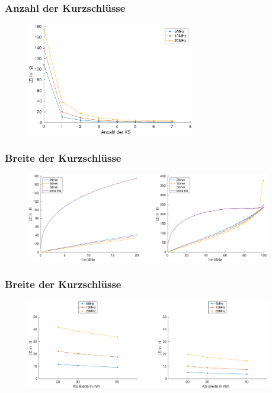 \documentclass[accentcolor=tud9b, colorbacktitle, inverttitle]{tudbeamer}
\begin{document}
\begin{frame}\frametitle{Anzahl der Kurzschl\"usse}
 \vspace{-1em}
\begin{figure}[h]
	\centering
	\includegraphics[width=0.65\textwidth]{RK_Impedanz_numberKS_frequenz}
\end{figure}
\end{frame}



\begin{frame}\frametitle{Breite der Kurzschlüsse}
\vspace{-1em}
\begin{figure}[h]
	\centering
	\includegraphics[width=0.95\textwidth]{Z_RK_width_1KS}
\end{figure}
\end{frame}


\begin{frame}\frametitle{Breite der Kurzschlüsse}
\vspace{-1em}
\begin{figure}[h]
	\centering
	\includegraphics[width=0.95\textwidth]{RK_Impedanz_width_frequenz}
\end{figure}
\end{frame}
\end{document}
